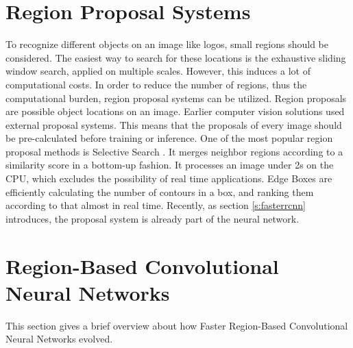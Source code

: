 \section{Region Proposal Systems}\label{s:rpn}
To recognize different objects on an image like logos, small regions should be considered. The easiest way to search for these locations is the exhaustive sliding window search, applied on multiple scales. However, this induces a lot of computational costs. In order to reduce the number of regions, thus the computational burden, region proposal systems can be utilized. Region proposals are possible object locations on an image.
\bigbreak
Earlier computer vision solutions used external proposal systems. This means that the proposals of every image should be pre-calculated before training or inference. One of the most popular region proposal methods is Selective Search \cite{Uijlings13}. It merges neighbor regions according to a similarity score in a bottom-up fashion. It processes an image under 2s on the CPU, which excludes the possibility of real time applications. Edge Boxes \cite{edge-boxes-locating-object-proposals-from-edges} are efficiently calculating the number of contours in a box, and ranking them according to that almost in real time. Recently, as section \ref{s:fasterrcnn} introduces, the proposal system is already part of the neural network.
\bigbreak
\section{Region-Based Convolutional Neural Networks}\label{s:rcnn}

This section gives a brief overview about how Faster Region-Based Convolutional Neural Networks evolved.
\bigbreak
